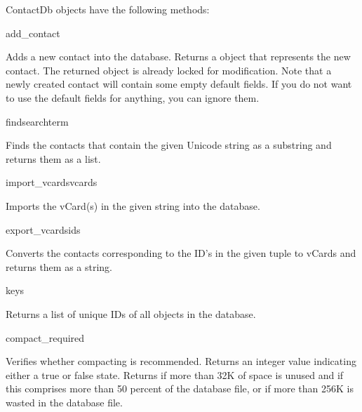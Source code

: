\begin{classdesc*}{ContactDb}
 objects have the following methods:

\begin{methoddesc}[ContactDb]{add_contact}{}

Adds a new contact into the database. Returns a  object that 
represents the new contact. The returned object is already locked for 
modification. Note that a newly created contact will contain some empty 
default fields. If you do not want to use the default fields for anything, 
you can ignore them.
 
\end{methoddesc}

\begin{methoddesc}[ContactDb]{find}{searchterm}

Finds the contacts that contain the given Unicode string as a substring and 
returns them as a list.

\end{methoddesc}

\begin{methoddesc}[ContactDb]{import_vcards}{vcards}

Imports the vCard(s) in the given string into the database. 

\end{methoddesc}

\begin{methoddesc}[ContactDb]{export_vcards}{ids}

Converts the contacts corresponding to the ID's in the given tuple  to vCards and returns 
them as a string.

\end{methoddesc}

\begin{methoddesc}[ContactDb]{keys}{}

Returns a list of unique IDs of all  objects in the 
database.

\end{methoddesc}

\begin{methoddesc}[ContactDb]{compact_required}{}

Verifies whether compacting is recommended. Returns an integer value 
indicating either a true or false state. Returns  if more than 
32K of space is unused and if this comprises more than 50 percent of the 
database file, or if more than 256K is wasted in the database file. 


\end{methoddesc}
\end{classdesc*}
